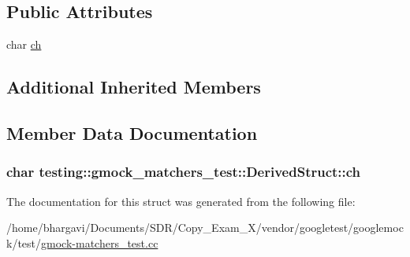 \subsection*{Public Attributes}
\begin{DoxyCompactItemize}
\item 
char \hyperlink{structtesting_1_1gmock__matchers__test_1_1_derived_struct_abd7de960817b2c889f109ae6f2869f4c}{ch}
\end{DoxyCompactItemize}
\subsection*{Additional Inherited Members}


\subsection{Member Data Documentation}
\subsubsection[{\texorpdfstring{ch}{ch}}]{\setlength{\rightskip}{0pt plus 5cm}char testing\+::gmock\+\_\+matchers\+\_\+test\+::\+Derived\+Struct\+::ch}\hypertarget{structtesting_1_1gmock__matchers__test_1_1_derived_struct_abd7de960817b2c889f109ae6f2869f4c}{}\label{structtesting_1_1gmock__matchers__test_1_1_derived_struct_abd7de960817b2c889f109ae6f2869f4c}


The documentation for this struct was generated from the following file\+:\begin{DoxyCompactItemize}
\item 
/home/bhargavi/\+Documents/\+S\+D\+R/\+Copy\+\_\+\+Exam\+\_\+X/vendor/googletest/googlemock/test/\hyperlink{gmock-matchers__test_8cc}{gmock-\/matchers\+\_\+test.\+cc}\end{DoxyCompactItemize}
